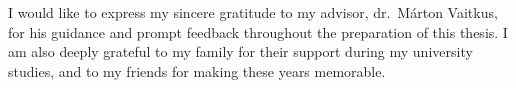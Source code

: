 \chapter*{\koszonetnyilvanitas}

I would like to express my sincere gratitude to my advisor, dr.\ Márton Vaitkus, for his guidance and prompt feedback throughout the preparation of this thesis. I am also deeply grateful to my family for their support during my university studies, and to my friends for making these years memorable.